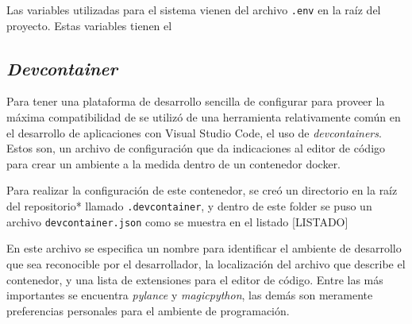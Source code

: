 Las variables utilizadas para el sistema vienen del archivo
\texttt{.env} en la raíz del proyecto. Estas variables tienen el

\subsection{\texorpdfstring{\emph{Devcontainer}}{Devcontainer}}\label{devcontainer}

Para tener una plataforma de desarrollo sencilla de configurar para
proveer la máxima compatibilidad de se utilizó de una herramienta
relativamente común en el desarrollo de aplicaciones con Visual Studio
Code, el uso de \emph{devcontainers}. Estos son, un archivo de
configuración que da indicaciones al editor de código para crear un
ambiente a la medida dentro de un contenedor docker.

Para realizar la configuración de este contenedor, se creó un directorio
en la raíz del repositorio* llamado \texttt{.devcontainer}, y dentro de
este folder se puso un archivo \texttt{devcontainer.json} como se
muestra en el listado {[}LISTADO{]}

\begin{Shaded}
\begin{Highlighting}[]
\FunctionTok{\{}
  \FunctionTok{:} \FunctionTok{,}
  \FunctionTok{:} \FunctionTok{,}
  \FunctionTok{:} \FunctionTok{,}
  \FunctionTok{:} \FunctionTok{,}
  \FunctionTok{:} \FunctionTok{,}
  \FunctionTok{:} \FunctionTok{,}
  \FunctionTok{:} \OtherTok{[}
	 \OtherTok{,}
	 \OtherTok{,}
	 \OtherTok{,}
	 \OtherTok{,}
	 \OtherTok{,}
	 \OtherTok{,}
	 \OtherTok{,}
	 \OtherTok{,}
	 \OtherTok{,}
	\OtherTok{]}
\FunctionTok{\}}
\end{Highlighting}
\end{Shaded}

En este archivo se especifica un nombre para identificar el ambiente de
desarrollo que sea reconocible por el desarrollador, la localización del
archivo que describe el contenedor, y una lista de extensiones para el
editor de código. Entre las más importantes se encuentra \emph{pylance}
y \emph{magicpython}, las demás son meramente preferencias personales
para el ambiente de programación.


